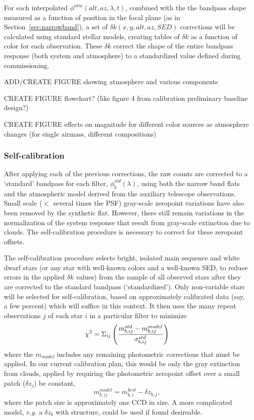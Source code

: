 \documentclass[12pt,preprint]{aastex}
\begin{document}
For each interpolated $\phi^{atm}(alt,az,\lambda,t)$, combined with
the the bandpass shape measured as a function of position in the focal
plane (as in Section~\ref{sec:narrowband}), a set of $\delta
k(x,y,alt,az,SED)$ corrections will be calculated using standard
stellar models, creating tables of $\delta k$ as a
function of color for each observation. These $\delta k$ correct the shape of the entire
bandpass response (both system and atmosphere) to a standardized value
defined during commissioning.

ADD/CREATE FIGURE showing atmosphere and various components

CREATE FIGURE flowchart? (like figure 4 from calibration preliminary
baseline design?)

CREATE FIGURE effects on magnitude for different color sources as
atmosphere changes (for single airmass, different compositions)

\subsubsection{Self-calibration}
\label{sec:selfcalib}

After applying each of the previous corrections, the raw counts are
corrected to a `standard' bandpass for each filter,
$\phi_b^{std}(\lambda)$, using both the narrow band flats and the
atmospheric model derived from the auxiliary telescope
observations. Small scale ($<$ several times the PSF) gray-scale
zeropoint variations have also been removed by the synthetic
flat. However, there still remain variations in the normalization of the
system response that result from gray-scale extinction due to
clouds. The self-calibration procedure is necessary to correct for
these zeropoint offsets.

The self-calibration procedure selects bright, isolated main sequence
and white dwarf stars (or any star with well-known colors and a
well-known SED, to reduce errors in the applied
$\delta k$ values) from the sample of all observed stars after they are
corrected to the standard bandpass (`standardized'). Only non-variable stars will be
selected for self-calibration, based on approximately calibrated data
(say, a few percent) which will suffice in this context. It then uses
the many repeat observations $j$ of each star $i$ in a particular filter to minimize
\begin{equation}
\label{eqn:selfcalmin}
\chi^2 = \Sigma_{ij} \left(  { m_{b,ij}^{std} - m_{b,ij}^{model} \over
    \sigma_{b,ij}^{std} } \right)
\end{equation}
where the $m_{model}$ includes any remaining photometric corrections
that must be applied. In our current calibration plan, this would be only the
gray extinction from clouds, applied by requiring the photometric
zeropoint offset over a small patch ($\delta z_j$) be constant, 
\begin{equation}
\label{eqn:zp}
m^{model}_{b,ij} = m^{best}_{b,i} - \delta z_{b,j},
\end{equation}
where the patch size is approximately one CCD in size. A more
complicated model, {\it e.g.} a $\delta z_{b}$ with structure, could
be used if found desireable.
\end{document}
